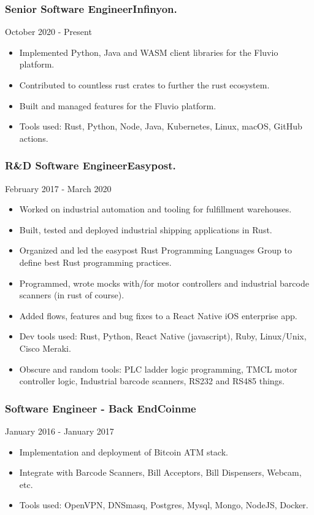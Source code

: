\documentclass[9pt]{article}
\newenvironment{changemargin}[2]{%
  \begin{list}{}{%
    \setlength{\topsep}{0pt}%
    \setlength{\leftmargin}{#1}%
    \setlength{\rightmargin}{#2}%
    \setlength{\listparindent}{\parindent}%
    \setlength{\itemindent}{\parindent}%
    \setlength{\parsep}{\parskip}%
  }%
  \item[]}{\end{list}
}
\newenvironment{body} {
    \vspace*{-16pt}
    \begin{changemargin}{-0.20in}{-0.5in}
  }
    {\end{changemargin}
}
\newenvironment{jobdescriptionlist}[3]{
  \subsubsection*{#1\hfill\small#2}
  \small
  \vspace*{-5pt}
  {\hfill #3}
  \vspace*{-10pt}
  \begin{itemize}
   \setlength{\topsep}{0pt}
   \setlength{\itemsep}{1pt}
   \setlength{\parskip}{0pt}
   \setlength{\parsep}{0pt}
}{\end{itemize}\vspace*{-3pt}\normalsize}
\begin{document}
\begin{body}
    \vspace{18pt}
    \begin{jobdescriptionlist}{Senior Software Engineer}{Infinyon.}{October 2020 - Present}
        \item Implemented Python, Java and WASM client libraries for the Fluvio platform.
        \item Contributed to countless rust crates to further the rust ecosystem.
        \item Built and managed features for the Fluvio platform.
        \item Tools used: Rust, Python, Node, Java, Kubernetes, Linux, macOS, GitHub actions.
    \end{jobdescriptionlist}

    \begin{jobdescriptionlist}{R\&D Software Engineer}{Easypost.}{February 2017 - March 2020}
        \item Worked on industrial automation and tooling for fulfillment warehouses.
        \item Built, tested and deployed industrial shipping applications in Rust.
        \item Organized and led the easypost Rust Programming Languages Group to define best Rust programming practices.
        \item Programmed, wrote mocks with/for motor controllers and industrial barcode scanners (in rust of course).
        \item Added flows, features and bug fixes to a React Native iOS enterprise app.
        \item Dev tools used: Rust, Python, React Native (javascript), Ruby, Linux/Unix, Cisco Meraki.
        \item Obscure and random tools: PLC ladder logic programming, TMCL motor controller logic, Industrial barcode scanners, RS232 and RS485 things.
    \end{jobdescriptionlist}

    \begin{jobdescriptionlist}{Software Engineer - Back End}{Coinme}{January 2016 - January 2017}
        \item Implementation and deployment of Bitcoin ATM stack.
        \item Integrate with Barcode Scanners, Bill Acceptors, Bill Dispensers, Webcam, etc.
        \item Tools used: OpenVPN, DNSmasq, Postgres, Mysql, Mongo, NodeJS, Docker.
    \end{jobdescriptionlist}


\end{body}
\end{document}
